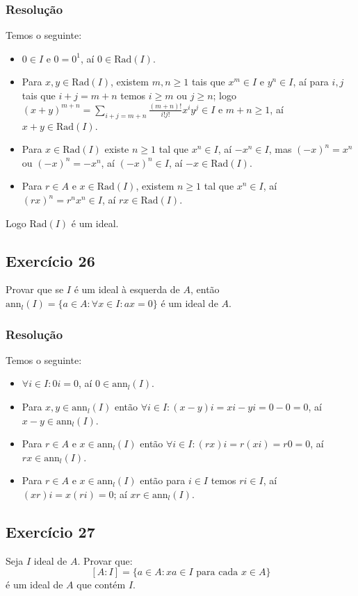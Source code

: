 \documentclass[10pt,a4paper]{article}
\begin{document}
\subsubsection*{Resolução}

Temos o seguinte:
\begin{itemize}
\item $0\in I$ e $0=0^1$, aí $0\in\mathrm{Rad}(I)$.
\item Para $x,y\in\mathrm{Rad}(I)$, existem $m,n\geq 1$ tais que $x^m\in I$ e $y^n\in I$, aí para $i,j$ tais que $i+j=m+n$ temos $i\geq m$ ou $j\geq n$; logo $(x+y)^{m+n}=\sum_{i+j=m+n}\frac{(m+n)!}{i!j!}x^iy^j\in I$ e $m+n\geq 1$, aí $x+y\in\mathrm{Rad}(I)$.
\item Para $x\in\mathrm{Rad}(I)$ existe $n\geq 1$ tal que $x^n\in I$, aí $-x^n\in I$, mas $(-x)^n=x^n$ ou $(-x)^n=-x^n$, aí $(-x)^n\in I$, aí $-x\in \mathrm{Rad}(I)$.
\item Para $r\in A$ e $x\in\mathrm{Rad}(I)$, existem $n\geq 1$ tal que $x^n\in I$, aí $(rx)^n=r^nx^n\in I$, aí $rx\in\mathrm{Rad}(I)$.
\end{itemize}
Logo $\mathrm{Rad}(I)$ é um ideal.

\subsection*{Exercício 26}
Provar que se $I$ é um ideal à esquerda de $A$, então $\mathrm{ann}_l(I)=\{a\in A: \forall x\in I:ax=0\}$ é um ideal de $A$.

\subsubsection*{Resolução}

Temos o seguinte:
\begin{itemize}
\item $\forall i\in I:0i=0$, aí $0\in\mathrm{ann}_l(I)$.
\item Para $x,y\in\mathrm{ann}_l(I)$ então $\forall i\in I:(x-y)i=xi-yi=0-0=0$, aí $x-y\in\mathrm{ann}_l(I)$.
\item Para $r\in A$ e $x\in\mathrm{ann}_l(I)$ então $\forall i\in I:(rx)i=r(xi)=r0=0$, aí $rx\in\mathrm{ann}_l(I)$.
\item Para $r\in A$ e $x\in\mathrm{ann}_l(I)$ então para $i\in I$ temos $ri\in I$, aí $(xr)i=x(ri)=0$; aí $xr\in\mathrm{ann}_l(I)$.
\end{itemize}

\subsection*{Exercício 27}
Seja $I$ ideal de $A$. Provar que:
\[
[A:I]=\{a\in A:xa\in I\text{ para cada }x\in A\}
\]
é um ideal de $A$ que contém $I$.
\end{document}
